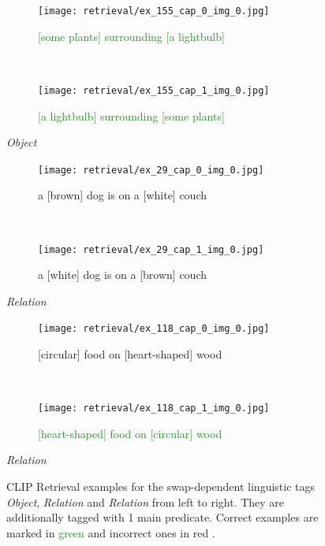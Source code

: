 \begin{figure}[ht]
\centering
    \begin{minipage}[t]{.30\textwidth}
        \begin{subfigure}[t]{\textwidth}
        \centering
        \texttt{[image: retrieval/ex\_155\_cap\_0\_img\_0.jpg]}
        \caption{\textcolor{ForestGreen}{[some plants] surrounding [a lightbulb] \cmark}}
        \end{subfigure}\\
        \begin{subfigure}[t]{\textwidth}
        \centering
        \texttt{[image: retrieval/ex\_155\_cap\_1\_img\_0.jpg]}
        \caption{\textcolor{ForestGreen}{[a lightbulb] surrounding [some plants] \cmark}}
        \end{subfigure}%
        \caption*{\textit{Object}}
    \end{minipage}
    \hfill
    \begin{minipage}[t]{.30\textwidth}
        \begin{subfigure}[t]{\textwidth}
        \centering
        \texttt{[image: retrieval/ex\_29\_cap\_0\_img\_0.jpg]}
        \caption{\textcolor{BrickRed}{a [brown] dog is on a [white] couch \xmark}}
        \end{subfigure}\\
        \begin{subfigure}[t]{\textwidth}
        \centering
        \texttt{[image: retrieval/ex\_29\_cap\_1\_img\_0.jpg]}
        \caption{\textcolor{BrickRed}{a [white] dog is on a [brown] couch \xmark}}
        \end{subfigure}%
        \caption*{\textit{Relation}}
    \end{minipage}
    \hfill
    \begin{minipage}[t]{.30\textwidth}
        \begin{subfigure}[t]{\textwidth}
        \centering
        \texttt{[image: retrieval/ex\_118\_cap\_0\_img\_0.jpg]}
        \caption{\textcolor{BrickRed}{[circular] food on [heart-shaped] wood \xmark}}
        \end{subfigure}\\
        \begin{subfigure}[t]{\textwidth}
        \centering
        \texttt{[image: retrieval/ex\_118\_cap\_1\_img\_0.jpg]}
        \caption{\textcolor{ForestGreen}{[heart-shaped] food on [circular] wood \cmark}}
        \end{subfigure}%
        \caption*{\textit{Relation}}
    \end{minipage}%
    \caption{CLIP Retrieval examples for the swap-dependent linguistic tags \textit{Object}, \textit{Relation} and \textit{Relation} from left to right. They are additionally tagged with 1 main predicate.  Correct examples are marked in \textcolor{ForestGreen}{green \cmark} and incorrect ones in \textcolor{BrickRed}{red \xmark}.}
    \label{fig:retrieval-examples}
\end{figure}

